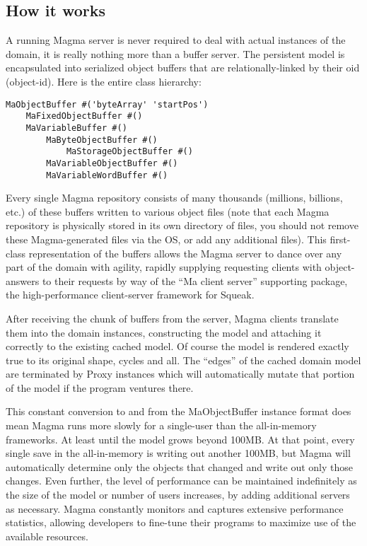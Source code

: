 \documentclass[a4paper,10pt,twoside]{book}
\newcommand{\ct}[1]{{\small\ttfamily\textup{#1}}}
\begin{document}
\subsection{How it works}
\label{book:advanced:persistency:magma:workings}

A running Magma server is never required to deal with actual instances of the domain, it is really nothing more than a buffer server. The persistent model is encapsulated into serialized object buffers that are relationally-linked by their \ct{oid} (object-id). Here is the entire class hierarchy:

\begin{lstlisting}
MaObjectBuffer #('byteArray' 'startPos')
    MaFixedObjectBuffer #()
    MaVariableBuffer #()
        MaByteObjectBuffer #()
            MaStorageObjectBuffer #()
        MaVariableObjectBuffer #()
        MaVariableWordBuffer #()
\end{lstlisting}

Every single Magma repository consists of many thousands (millions, billions, etc.) of these buffers written to various object files (note that each Magma repository is physically stored in its own directory of files, you should not remove these Magma-generated files via the OS, or add any additional files). This first-class representation of the buffers allows the Magma server to dance over any part of the domain with agility, rapidly supplying requesting clients with object-answers to their requests by way of the ``Ma client server'' supporting package, the high-performance client-server framework for Squeak.

After receiving the chunk of buffers from the server, Magma clients translate them into the domain instances, constructing the model and attaching it correctly to the existing cached model. Of course the model is rendered exactly true to its original shape, cycles and all. The ``edges'' of the cached domain model are terminated by Proxy instances which will automatically mutate that portion of the model if the program ventures there.

This constant conversion to and from the MaObjectBuffer instance format does mean Magma runs more slowly for a single-user than the all-in-memory frameworks. At least until the model grows beyond 100MB. At that point, every single save in the all-in-memory is writing out another 100MB, but Magma will automatically determine only the objects that changed and write out only those changes. Even further, the level of performance can be maintained indefinitely as the size of the model or number of users increases, by adding additional servers as necessary. Magma constantly monitors and captures extensive performance statistics, allowing developers to fine-tune their programs to maximize use of the available resources.
\end{document}
